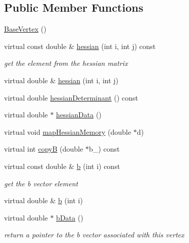\subsection*{Public Member Functions}
\begin{DoxyCompactItemize}
\item 
\mbox{\hyperlink{classg2o_1_1_base_vertex_a40fcd78e21bb4aedf7e299922c650937}{Base\+Vertex}} ()
\item 
virtual const double \& \mbox{\hyperlink{classg2o_1_1_base_vertex_ac35e0c8c62a59e947ac7710ed85fcd7a}{hessian}} (int i, int j) const
\begin{DoxyCompactList}\small\item\em get the element from the hessian matrix \end{DoxyCompactList}\item 
virtual double \& \mbox{\hyperlink{classg2o_1_1_base_vertex_a6ab2212fdb00dec460299fdbabe09cb9}{hessian}} (int i, int j)
\item 
virtual double \mbox{\hyperlink{classg2o_1_1_base_vertex_a1217e0fe47e7259f039d468397cddb15}{hessian\+Determinant}} () const
\item 
virtual double $\ast$ \mbox{\hyperlink{classg2o_1_1_base_vertex_aedf92fbb5c2c86185422a955be02a3a6}{hessian\+Data}} ()
\item 
virtual void \mbox{\hyperlink{classg2o_1_1_base_vertex_a54227ac315e6bc75c63ed117a2c75668}{map\+Hessian\+Memory}} (double $\ast$d)
\item 
virtual int \mbox{\hyperlink{classg2o_1_1_base_vertex_a3629d3b15da425476e15867fb03b781b}{copyB}} (double $\ast$b\+\_\+) const
\item 
virtual const double \& \mbox{\hyperlink{classg2o_1_1_base_vertex_a837ef1047343d927edb48ad8d510fe90}{b}} (int i) const
\begin{DoxyCompactList}\small\item\em get the b vector element \end{DoxyCompactList}\item 
virtual double \& \mbox{\hyperlink{classg2o_1_1_base_vertex_a5c235369ef3fb58de65b90c8cc37d611}{b}} (int i)
\item 
virtual double $\ast$ \mbox{\hyperlink{classg2o_1_1_base_vertex_ac8edea7073e5850c90b0ba37092b8f84}{b\+Data}} ()
\begin{DoxyCompactList}\small\item\em return a pointer to the b vector associated with this vertex \end{DoxyCompactList}\item 

\end{DoxyCompactItemize}
